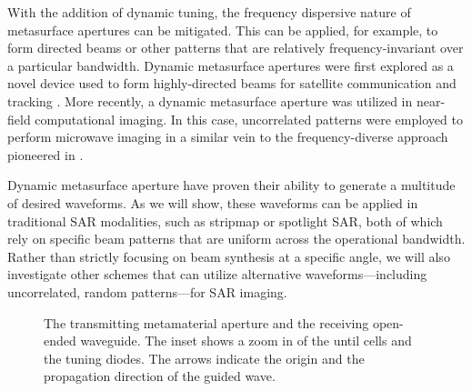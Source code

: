 \documentclass[journal]{IEEEtran}
\begin{document}
With the addition of dynamic tuning, the frequency dispersive nature of metasurface apertures can be mitigated. This can be applied, for example, to form directed beams or other patterns that are relatively frequency-invariant over a particular bandwidth. Dynamic metasurface apertures were first explored as a novel device used to form highly-directed beams for satellite communication and tracking \cite{johnson2015sidelobeCancel}.  More recently, a dynamic metasurface aperture was utilized in near-field computational imaging. In this case, uncorrelated patterns were employed to perform microwave imaging in a similar vein to the frequency-diverse approach pioneered in \cite{sleasman2015DyAp1,sleasmanMarathon}.

Dynamic metasurface aperture have proven their ability to generate a multitude of desired waveforms. As we will show, these waveforms can be applied in traditional SAR modalities, such as stripmap or spotlight SAR, both of which rely on specific beam patterns that are uniform across the operational bandwidth. Rather than strictly focusing on beam synthesis at a specific angle, we will also investigate other schemes that can utilize alternative waveforms---including uncorrelated, random patterns---for SAR imaging.

\begin{figure}
	\centering
	\caption{\label{fig:f2}The transmitting metamaterial aperture and the receiving open-ended waveguide. The inset shows a zoom in of the until cells and the tuning diodes. The arrows indicate the origin and the propagation direction of the guided wave.}
\end{figure}
\end{document}

